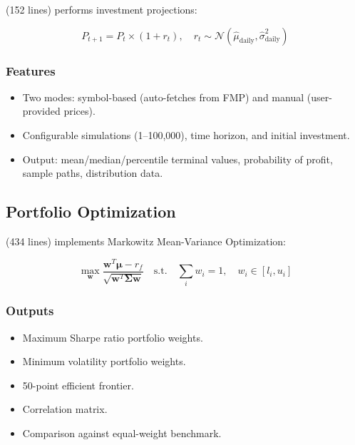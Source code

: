  (152 lines) performs investment projections:

\begin{equation}
P_{t+1} = P_t \times (1 + r_t), \quad r_t \sim \mathcal{N}(\hat{\mu}_{\text{daily}}, \hat{\sigma}_{\text{daily}}^2)
\end{equation}

\subsubsection{Features}

\begin{itemize}
  \item Two modes: symbol-based (auto-fetches from FMP) and manual (user-provided prices).
  \item Configurable simulations (1--100,000), time horizon, and initial investment.
  \item Output: mean/median/percentile terminal values, probability of profit, sample paths, distribution data.
\end{itemize}

\subsection{Portfolio Optimization}

 (434 lines) implements Markowitz Mean-Variance Optimization:

\begin{equation}
\max_{\mathbf{w}} \frac{\mathbf{w}^T \boldsymbol{\mu} - r_f}{\sqrt{\mathbf{w}^T \boldsymbol{\Sigma} \mathbf{w}}}
\quad \text{s.t.} \quad \sum_i w_i = 1, \quad w_i \in [l_i, u_i]
\label{eq:mvo}
\end{equation}

\subsubsection{Outputs}

\begin{itemize}
  \item Maximum Sharpe ratio portfolio weights.
  \item Minimum volatility portfolio weights.
  \item 50-point efficient frontier.
  \item Correlation matrix.
  \item Comparison against equal-weight benchmark.
\end{itemize}


